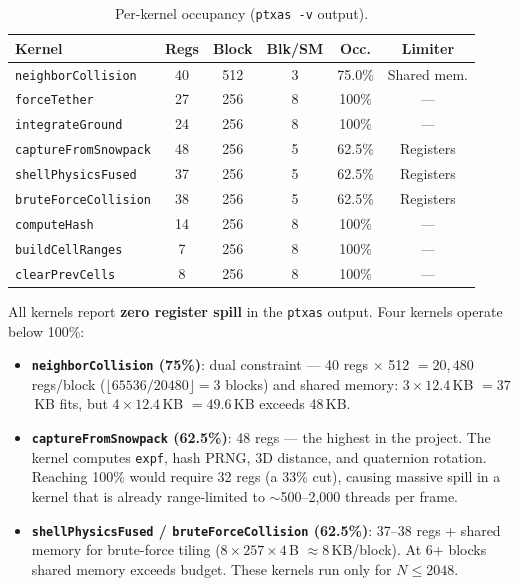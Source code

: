 \begin{table}[H]
  \caption{Per-kernel occupancy (\texttt{ptxas~-v} output).}
  \label{tab:occupancy}
  \centering
  \scriptsize
  \begin{tabular}{@{}lccccc@{}}
    \toprule
    \textbf{Kernel} & \textbf{Regs} & \textbf{Block} & \textbf{Blk/SM}
      & \textbf{Occ.} & \textbf{Limiter} \\
    \midrule
    \texttt{neighborCollision}    & 40 & 512 & 3 & 75.0\% & Shared mem. \\
    \texttt{forceTether}          & 27 & 256 & 8 & 100\%  & --- \\
    \texttt{integrateGround}      & 24 & 256 & 8 & 100\%  & --- \\
    \texttt{captureFromSnowpack}  & 48 & 256 & 5 & 62.5\% & Registers \\
    \texttt{shellPhysicsFused}    & 37 & 256 & 5 & 62.5\% & Registers \\
    \texttt{bruteForceCollision}  & 38 & 256 & 5 & 62.5\% & Registers \\
    \texttt{computeHash}          & 14 & 256 & 8 & 100\%  & --- \\
    \texttt{buildCellRanges}      &  7 & 256 & 8 & 100\%  & --- \\
    \texttt{clearPrevCells}       &  8 & 256 & 8 & 100\%  & --- \\
    \bottomrule
  \end{tabular}
\end{table}

All kernels report \textbf{zero register spill} in the \texttt{ptxas} output.
Four kernels operate below 100\%:

\begin{itemize}
  \item \textbf{\texttt{neighborCollision} (75\%)}: dual constraint --- 40
        regs $\times$ 512 $= 20{,}480$ regs/block ($\lfloor65536/20480\rfloor
        = 3$ blocks) and shared memory: $3 \times 12.4$\,KB $= 37$\,KB fits,
        but $4 \times 12.4$\,KB $= 49.6$\,KB exceeds 48\,KB.
  \item \textbf{\texttt{captureFromSnowpack} (62.5\%)}: 48 regs --- the
        highest in the project. The kernel computes \texttt{expf}, hash PRNG,
        3D distance, and quaternion rotation. Reaching 100\% would require 32
        regs (a 33\% cut), causing massive spill in a kernel that is already
        range-limited to $\sim$500--2{,}000 threads per frame.
  \item \textbf{\texttt{shellPhysicsFused} / \texttt{bruteForceCollision}
        (62.5\%)}: 37--38 regs + shared memory for brute-force tiling
        ($8 \times 257 \times 4$\,B $\approx 8$\,KB/block). At 6+ blocks
        shared memory exceeds budget. These kernels run only for
        $N \leq 2048$.
\end{itemize}

